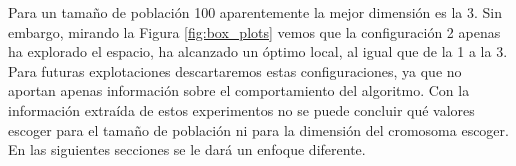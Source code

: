 Para un tamaño de población 100 aparentemente la mejor dimensión es la 3. Sin embargo, mirando la Figura \ref{fig:box_plots} vemos
que la configuración 2 apenas ha explorado el espacio, ha alcanzado un óptimo local, al igual que de la 1 a la 3. Para
futuras explotaciones descartaremos estas configuraciones, ya que no aportan apenas información sobre el comportamiento del algoritmo.
Con la información extraída de estos experimentos no se puede concluir qué valores escoger para el tamaño de población ni para la
dimensión del cromosoma escoger. En las siguientes secciones se le dará un enfoque diferente.